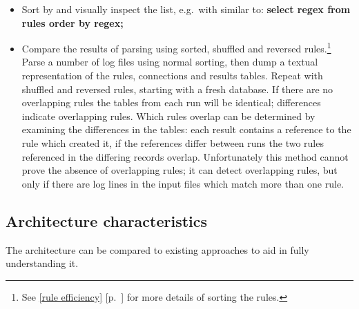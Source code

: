 \documentclass[draft]{svmult}
\newcommand{\refwithpage}[1]{%
    \empty{}\ref{#1} [p.~\pageref{#1}]%
}
\newcommand{\sectionref}[1]{%
    \textsection{}\refwithpage{#1}%
}
\begin{document}
\begin{itemize}

    \item Sort by \regex{} and visually inspect the list, e.g.\ with \SQL{}
        similar to: \textbf{select regex from rules order by regex;}

    \item Compare the results of parsing using sorted, shuffled and
        reversed rules.\footnote{See \sectionref{rule efficiency} for more
        details of sorting the rules.}  Parse a number of log files using
        normal sorting, then dump a textual representation of the rules,
        connections and results tables.  Repeat with shuffled and reversed
        rules, starting with a fresh database.  If there are no overlapping
        rules the tables from each run will be identical; differences
        indicate overlapping rules.  Which rules overlap can be determined
        by examining the differences in the tables: each result contains a
        reference to the rule which created it, if the references differ
        between runs the two rules referenced in the differing records
        overlap.  Unfortunately this method cannot prove the absence of
        overlapping rules; it can detect overlapping rules, but only if
        there are log lines in the input files which match more than one
        rule.

\end{itemize}




\subsection{Architecture characteristics}

\label{Architecture characteristics}

The architecture can be compared to existing approaches to aid in fully
understanding it.
\end{document}
